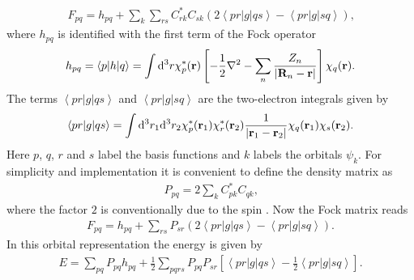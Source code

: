 \documentclass[twoside,        %
			   12pt,			%
               BCOR10mm,       %
               ngerman,english  %
               ]{scrartcl}
\begin{document}
\begin{align*}
F_{pq} = h_{pq} + \sum\limits_k \sum\limits_{rs} C_{rk}^* C_{sk} \left( 2 \left<pr|g|qs\right> -  \left<pr|g|sq\right> \right)\text{,}
\end{align*} where $h_{pq}$ is identified with the first term of the Fock operator
\begin{align*}
h_{pq} = \left< p|h|q\right> = \int \mathrm{d}^3 r \chi_p^*(\mathbf{r})\left[ -\frac{1}{2} \nabla^2 - \sum\limits_n \frac{Z_n}{\left| \mathbf{R}_n -\mathbf{r} \right|} \right]\chi_q(\mathbf{r})\text{.}
\end{align*} The terms $\left<pr|g|qs\right>$ and $\left<pr|g|sq\right>$ are the two-electron integrals given by
\begin{align*}
\left<pr|g|qs\right> = \int \mathrm{d}^3 r_1 \mathrm{d}^3 r_2 \chi_p^*(\mathbf{r}_1) \chi_r^*(\mathbf{r}_2) \frac{1}{\left| \mathbf{r}_1 -\mathbf{r}_2 \right|} \chi_q(\mathbf{r}_1) \chi_s(\mathbf{r}_2) \text{.}
\end{align*} Here $p$, $q$, $r$ and $s$ label the basis functions and $k$ labels the orbitals $\psi_k$.
For simplicity and implementation it is convenient to define the density matrix as
\begin{align*}
P_{pq} = 2\sum\limits_k C_{pk}^* C_{qk} \text{,}
\end{align*} where the factor $2$ is conventionally due to the spin \cite{Thijssen2007}.
Now the Fock matrix reads
\begin{align*}
F_{pq} = h_{pq} + \sum\limits_{rs} P_{sr} \left( 2 \left<pr|g|qs\right> -  \left<pr|g|sq\right> \right)\text{.}
\end{align*} In this orbital representation the energy is given by
\begin{align*}
E = \sum\limits_{pq} P_{pq}h_{pq} + \frac{1}{2}  \sum\limits_{pqrs} P_{pq}P_{sr} \left[ \left<pr|g|qs\right> -  \frac{1}{2}\left<pr|g|sq\right> \right] \text{.}
\end{align*}
\end{document}
